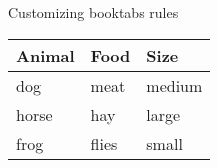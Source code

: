 \documentclass{article}
\begin{document}
Customizing booktabs rules

\begin{tabular}{@{} lll@{}}     \toprule[2pt]
    Animal  & Food  & Size      \\ \midrule[1pt]
    dog     & meat  & medium    \\
    \cmidrule[0.5pt](r{1pt}l{1cm}){1-2}
    horse   & hay   & large     \\
    frog    & flies & small     \\ \bottomrule[2pt]
\end{tabular}
\end{document}
